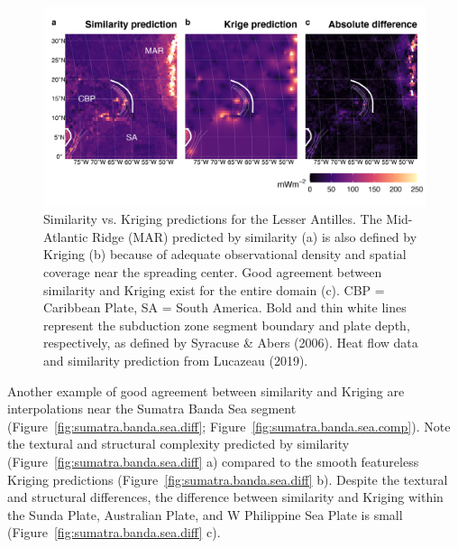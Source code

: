\documentclass[draft,linenumbers]{agujournal2018}
\begin{document}
\begin{figure}[h]

{\centering \includegraphics[width=0.95\linewidth,]{../figs/diff/custom/Lesser_Antilles} 

}

\caption{Similarity vs. Kriging predictions for the Lesser Antilles. The Mid-Atlantic Ridge (MAR) predicted by similarity (a) is also defined by Kriging (b) because of adequate observational density and spatial coverage near the spreading center. Good agreement between similarity and Kriging exist for the entire domain (c). CBP = Caribbean Plate, SA = South America. Bold and thin white lines represent the subduction zone segment boundary and plate depth, respectively, as defined by Syracuse \& Abers (2006). Heat flow data and similarity prediction from Lucazeau (2019).}\label{fig:lesser.antilles.diff}
\end{figure}

Another example of good agreement between similarity and Kriging are
interpolations near the Sumatra Banda Sea segment
(Figure~\ref{fig:sumatra.banda.sea.diff};
Figure~\ref{fig:sumatra.banda.sea.comp}). Note the textural and
structural complexity predicted by similarity
(Figure~\ref{fig:sumatra.banda.sea.diff} a) compared to the smooth
featureless Kriging predictions (Figure~\ref{fig:sumatra.banda.sea.diff}
b). Despite the textural and structural differences, the difference
between similarity and Kriging within the Sunda Plate, Australian Plate,
and W Philippine Sea Plate is small
(Figure~\ref{fig:sumatra.banda.sea.diff} c).
\end{document}
